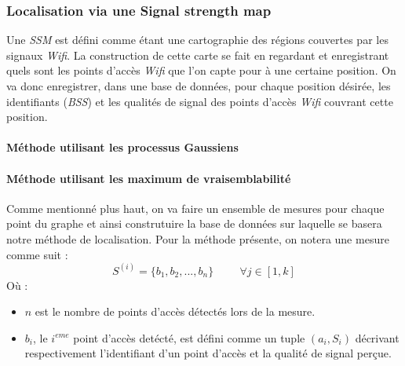 \documentclass[11pt,journal,compsoc]{IEEEtran}
\begin{document}
    \subsubsection{Localisation via une Signal strength map}
      Une \textit{SSM} est défini comme étant une cartographie des régions couvertes par les signaux \textit{Wifi}. La construction de cette carte se fait en regardant et enregistrant quels sont les points d'accès \textit{Wifi} que l'on capte pour à une certaine position. On va donc enregistrer, dans une base de données, pour chaque position désirée, les identifiants (\textit{BSS}) et les qualités de signal des points d'accès \textit{Wifi} couvrant cette position.
      \paragraph{Méthode utilisant les processus Gaussiens}
      \paragraph{Méthode utilisant les maximum de vraisemblabilité}
        Comme mentionné plus haut, on va faire un ensemble de mesures pour chaque point du graphe et ainsi construtuire la base de données sur laquelle se basera notre méthode de localisation. Pour la méthode présente, on notera une mesure comme suit :
        \begin{equation}
          S^{(i)}=\{b_{1}, b_{2}, ..., b_{n}\} \hspace{1cm} \forall j \in [1, k]
        \end{equation}
        Où :
        \begin{itemize}
          \item $n$ est le nombre de points d'accès détectés lors de la mesure.
          \item $b_{i}$, le $i^{eme}$ point d'accès detécté, est défini comme un tuple $(a_{i}, S_{i})$ décrivant respectivement l'identifiant d'un point d'accès et la qualité de signal perçue.
        \end{itemize}
        
\end{document}
